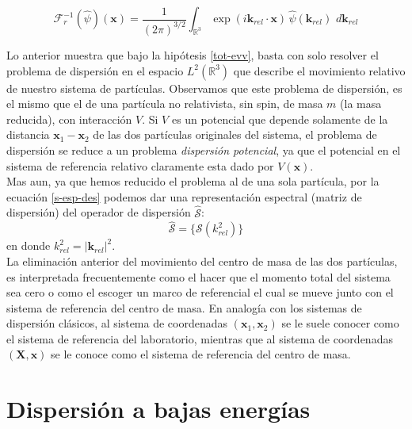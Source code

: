 \documentclass[12pt]{book}
\numberwithin{equation}{chapter}
\def\R{\mathbb{R}}
\def\S{\mathcal{S}}
\def\F{\mathcal{F}}
\def\x{\mathbf{x}}
\def\xx{\mathbf{X}}
\def\k{\mathbf{k}}
\begin{document}
\begin{equation}
\F_{r}^{-1}( \hat{\psi} )(\x) =\frac{1}{(2 \pi)^{3/2}} \int_{\R^{3}} \exp( i\k_{rel} \cdot \x )\, \hat{\psi} (\k_{rel}) \, \, d\k_{rel}
\end{equation}

Lo anterior muestra que bajo la hip\'otesis \eqref{tot-evv}, basta con solo resolver el problema de dispersi\'on en el espacio $L^{2}(\R^{3})$ que describe el movimiento relativo de nuestro sistema de part\'iculas. Observamos que este problema de dispersi\'on, es el mismo que el de una part\'icula no relativista, sin spin, de masa $m$ (la masa reducida), con interacci\'on $V$. Si $V$ es un potencial que depende solamente de la distancia $\x_{1} - \x_{2}$ de las dos part\'iculas originales del sistema, el problema de dispersi\'on se reduce a un problema \emph{dispersi\'on potencial}, ya que el potencial en el sistema de referencia relativo claramente esta dado por $V(\x)$.\\ 

Mas aun, ya que hemos reducido el problema al de una sola part\'icula, por la ecuaci\'on \eqref{s-esp-des} podemos dar una representaci\'on espectral (matriz de dispersi\'on) del operador de dispersi\'on $\hat{\S}$:
\begin{equation}\label{sp-mat}
\hat{\S}= \{ \S(k_{rel}^{2}) \}
\end{equation}
en donde $k_{rel}^{2} =|\k_{rel}|^{2}$.\\

La eliminaci\'on anterior del movimiento del centro de masa de las dos part\'iculas, es interpretada frecuentemente como el hacer que el momento total del sistema sea cero o como el escoger un marco de referencial el cual se mueve junto con el sistema de referencia del centro de masa. En analog\'ia con los sistemas de dispersi\'on cl\'asicos, al sistema de coordenadas $(\x_{1},\x_{2})$ se le suele conocer como el sistema de referencia del laboratorio, mientras que al sistema de coordenadas $(\xx , \x )$ se le conoce como el sistema de referencia del centro de masa.

\newpage

\chapter{Dispersi\'on a bajas energ\'ias}
\end{document}
